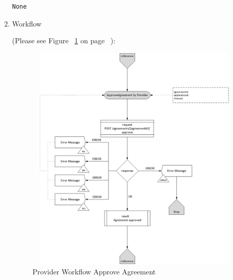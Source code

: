 \begin{enumerate}
\begin{tcolorbox}[boxrule=0pt, frame empty]
\begin{verbatim}
None

\end{verbatim}
\end{tcolorbox}


\item Workflow

(Please see Figure ~\ref{fig:PAA} on page ~\pageref{fig:PAA}):

\begin{figure}[H]
    \centering
    \includegraphics[width=11cm,height=11cm,angle=0]{./diag/Workflow/Market/ApproveAgreement-P-Workflow.png}
    \caption{Provider Workflow Approve Agreement  }
	\label{fig:PAA}
\end{figure}

\end{enumerate}

